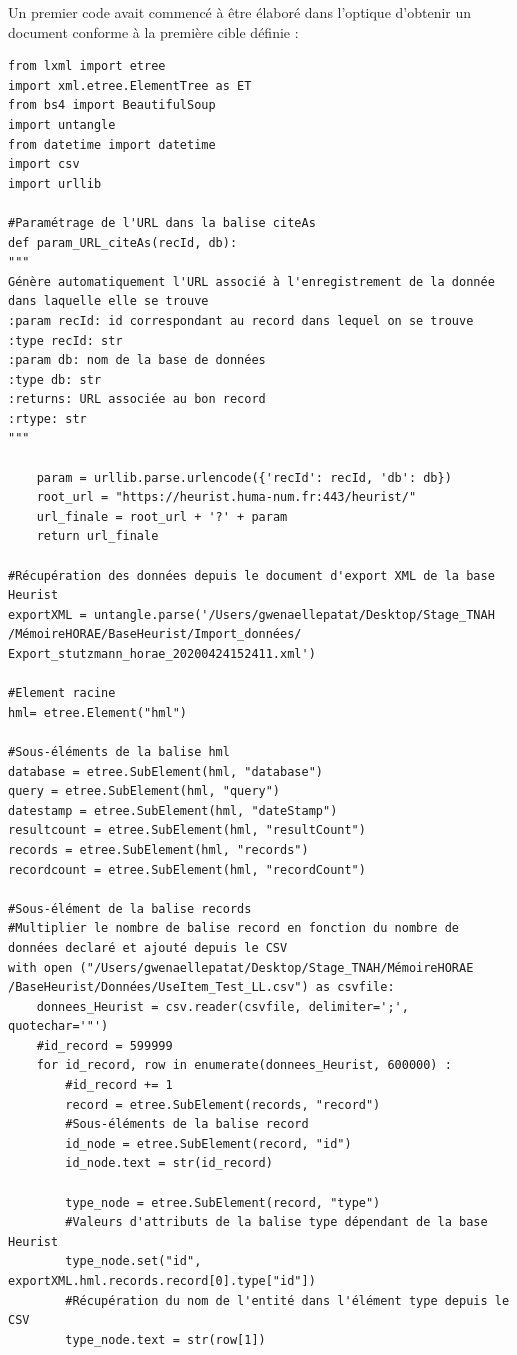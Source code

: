 \documentclass[a4paper,12pt,twoside]{book}
\begin{document}
	Un premier code avait commencé à être élaboré dans l'optique d'obtenir un document conforme à la première cible définie : 
	\begin{verbatim}
from lxml import etree
import xml.etree.ElementTree as ET
from bs4 import BeautifulSoup
import untangle
from datetime import datetime
import csv
import urllib

#Paramétrage de l'URL dans la balise citeAs
def param_URL_citeAs(recId, db):
"""
Génère automatiquement l'URL associé à l'enregistrement de la donnée 
dans laquelle elle se trouve   
:param recId: id correspondant au record dans lequel on se trouve
:type recId: str
:param db: nom de la base de données
:type db: str
:returns: URL associée au bon record
:rtype: str
"""
    
    param = urllib.parse.urlencode({'recId': recId, 'db': db})
    root_url = "https://heurist.huma-num.fr:443/heurist/"
    url_finale = root_url + '?' + param
    return url_finale

#Récupération des données depuis le document d'export XML de la base Heurist
exportXML = untangle.parse('/Users/gwenaellepatat/Desktop/Stage_TNAH
/MémoireHORAE/BaseHeurist/Import_données/
Export_stutzmann_horae_20200424152411.xml')

#Element racine
hml= etree.Element("hml")

#Sous-éléments de la balise hml
database = etree.SubElement(hml, "database")
query = etree.SubElement(hml, "query")
datestamp = etree.SubElement(hml, "dateStamp")
resultcount = etree.SubElement(hml, "resultCount")
records = etree.SubElement(hml, "records")
recordcount = etree.SubElement(hml, "recordCount")

#Sous-élément de la balise records
#Multiplier le nombre de balise record en fonction du nombre de 
données declaré et ajouté depuis le CSV
with open ("/Users/gwenaellepatat/Desktop/Stage_TNAH/MémoireHORAE
/BaseHeurist/Données/UseItem_Test_LL.csv") as csvfile:
    donnees_Heurist = csv.reader(csvfile, delimiter=';', quotechar='"')
    #id_record = 599999
    for id_record, row in enumerate(donnees_Heurist, 600000) :
        #id_record += 1
        record = etree.SubElement(records, "record")
        #Sous-éléments de la balise record
        id_node = etree.SubElement(record, "id")
        id_node.text = str(id_record)

        type_node = etree.SubElement(record, "type")
        #Valeurs d'attributs de la balise type dépendant de la base Heurist
        type_node.set("id", exportXML.hml.records.record[0].type["id"])
        #Récupération du nom de l'entité dans l'élément type depuis le CSV
        type_node.text = str(row[1])


\end{verbatim}
\end{document}
